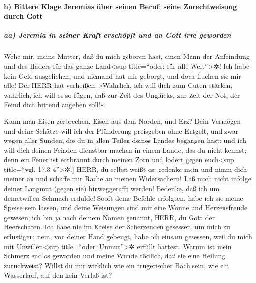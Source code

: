 \hypertarget{h-bittere-klage-jeremias-uxfcber-seinen-beruf-seine-zurechtweisung-durch-gott}{%
\paragraph{h) Bittere Klage Jeremias über seinen Beruf; seine
Zurechtweisung durch
Gott}\label{h-bittere-klage-jeremias-uxfcber-seinen-beruf-seine-zurechtweisung-durch-gott}}

\hypertarget{aa-jeremia-in-seiner-kraft-erschuxf6pft-und-an-gott-irre-geworden}{%
\subparagraph{aa) Jeremia in seiner Kraft erschöpft und an Gott irre
geworden}\label{aa-jeremia-in-seiner-kraft-erschuxf6pft-und-an-gott-irre-geworden}}

Wehe mir, meine Mutter, daß du mich geboren hast, einen
Mann der Anfeindung und des Haders für das ganze Land\textless sup
title=``oder: für alle Welt''\textgreater✲! Ich habe kein Geld
ausgeliehen, und niemand hat mir geborgt, und doch fluchen sie mir alle!
Der HERR hat verheißen: »Wahrlich, ich will dich zum
Guten stärken, wahrlich, ich will es so fügen, daß zur Zeit des
Unglücks, zur Zeit der Not, der Feind dich bittend angehen soll!«

\bibleverse{12}{[}Kann man Eisen zerbrechen, Eisen aus dem Norden, und
Erz? Dein Vermögen und deine Schätze will ich der
Plünderung preisgeben ohne Entgelt, und zwar wegen aller Sünden, die du
in allen Teilen deines Landes begangen hast; und ich will
dich deinen Feinden dienstbar machen in einem Lande, das du nicht
kennst; denn ein Feuer ist entbrannt durch meinen Zorn und lodert gegen
euch\textless sup title=``vgl. 17,3-4''\textgreater✲.{]}
HERR, du selbst weißt es: gedenke mein und nimm dich
meiner an und schaffe mir Rache an meinen Widersachern! Laß mich nicht
infolge deiner Langmut (gegen sie) hinweggerafft werden! Bedenke, daß
ich um deinetwillen Schmach erdulde! Sooft deine Befehle
erfolgten, habe ich sie meine Speise sein lassen, und deine Weisungen
sind mir eine Wonne und Herzensfreude gewesen; ich bin ja nach deinem
Namen genannt, HERR, du Gott der Heerscharen. Ich habe
nie im Kreise der Scherzenden gesessen, um mich zu erlustigen; nein, von
deiner Hand gebeugt, habe ich einsam gesessen, weil du mich mit
Unwillen\textless sup title=``oder: Unmut''\textgreater✲ erfüllt
hattest. Warum ist mein Schmerz endlos geworden und meine
Wunde tödlich, daß sie eine Heilung zurückweist? Willst du mir wirklich
wie ein trügerischer Bach sein, wie ein Wasserlauf, auf den kein Verlaß
ist?

